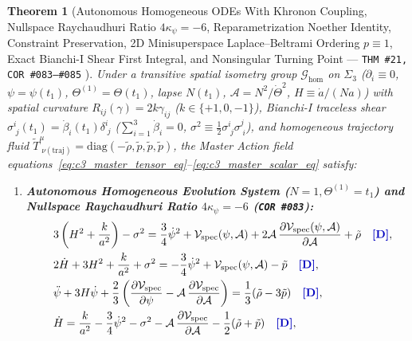 \documentclass[11pt,a4paper]{article}
\newcommand{\catD}{\text{\textbf{\textcolor{blue!75!black}{[D]}}}}
\theoremstyle{definition}
\theoremstyle{plain}
\newtheorem{theorem}[axiom]{Theorem}
\theoremstyle{remark}
\begin{document}
\begin{theorem}[{Autonomous Homogeneous ODEs With Khronon Coupling, Nullspace Raychaudhuri Ratio $4\kappa_\psi = -6$, Reparametrization Noether Identity, Constraint Preservation, 2D Minisuperspace Laplace--Beltrami Ordering $p \equiv 1$, Exact Bianchi-I Shear First Integral, and Nonsingular Turning Point --- \texttt{THM~\#21, COR~\#083--\#085} \catD}]\label{thm:c5_homogeneous_odes}\label{thm:c5_homogeneous_odes_and_bounce}
Under a transitive spatial isometry group $\mathcal{G}_{\mathrm{hom}}$ on $\Sigma_3$ ($\partial_i \equiv 0$, $\psi = \psi(t_1)$, $\Theta^{(1)} = \Theta(t_1)$, lapse $N(t_1)$, $\mathcal{A} = N^2/\dot{\Theta}^2$, $H \equiv \dot{a}/(Na)$) with spatial curvature $R_{ij}(\gamma) = 2k\gamma_{ij}$ ($k \in \{+1, 0, -1\}$), Bianchi-I traceless shear $\sigma^i_{\;j}(t_1) = \dot{\beta}_i(t_1)\delta^i_{\;j}$ ($\sum_{i=1}^3\dot{\beta}_i = 0$, $\sigma^2 \equiv \frac{1}{2}\sigma^i_{\;j}\sigma^j_{\;i}$), and homogeneous trajectory fluid $\tilde{T}^\mu_{\;\nu(\mathrm{traj})} = \mathrm{diag}(-\tilde{\rho}, \tilde{p}, \tilde{p}, \tilde{p})$, the Master Action field equations~\eqref{eq:c3_master_tensor_eq}--\eqref{eq:c3_master_scalar_eq} satisfy:
\begin{enumerate}[label=(\roman*)]
  \item \textbf{Autonomous Homogeneous Evolution System ($N = 1, \Theta^{(1)} = t_1$) and Nullspace Raychaudhuri Ratio $4\kappa_\psi = -6$ (\texttt{COR~\#083}):}
 \begin{align}
    &\quad 3\left(H^2 + \frac{k}{a^2}\right) - \sigma^2 = \frac{3}{4}\dot{\psi}^2 + \mathcal{V}_{\mathrm{spec}}(\psi, \mathcal{A}) + 2\mathcal{A}\,\frac{\partial\mathcal{V}_{\mathrm{spec}}(\psi, \mathcal{A})}{\partial\mathcal{A}} + \tilde{\rho} \quad \catD, \label{eq:c5_friedmann1} \\
    &\quad 2\dot{H} + 3H^2 + \frac{k}{a^2} + \sigma^2 = -\frac{3}{4}\dot{\psi}^2 + \mathcal{V}_{\mathrm{spec}}(\psi, \mathcal{A}) - \tilde{p} \quad \catD, \label{eq:c5_friedmann2} \\
    &\quad \ddot{\psi} + 3H\dot{\psi} + \frac{2}{3}\left(\frac{\partial\mathcal{V}_{\mathrm{spec}}}{\partial\psi} - \mathcal{A}\,\frac{\partial\mathcal{V}_{\mathrm{spec}}}{\partial\mathcal{A}}\right) = \frac{1}{3}(\tilde{\rho} - 3\tilde{p}) \quad \catD, \label{eq:c5_klein_gordon} \\
    &\quad \dot{H} = \frac{k}{a^2} - \frac{3}{4}\dot{\psi}^2 - \sigma^2 - \mathcal{A}\,\frac{\partial\mathcal{V}_{\mathrm{spec}}}{\partial\mathcal{A}} - \frac{1}{2}(\tilde{\rho} + \tilde{p}) \quad \catD, \label{eq:c5_hdot} \\

\end{align}
\end{enumerate}
\end{theorem}
\end{document}
